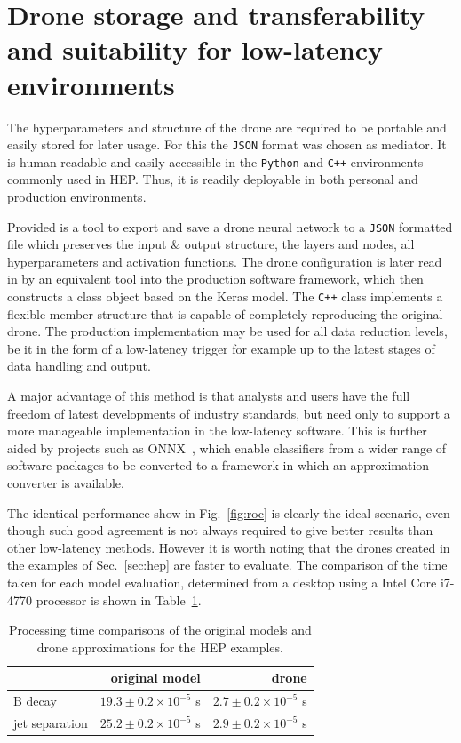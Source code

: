 \documentclass[final,5p,times,twocolumn]{elsarticle}
\begin{document}
\section{Drone storage and transferability and suitability
for low-latency environments}
\label{sec:storage}

The hyperparameters and structure of the drone are required to be
portable and easily stored for later usage. For this the {\tt JSON} format was chosen as
mediator. It is human-readable and easily accessible in the {\tt Python} and {\tt C++}
environments commonly used in HEP. Thus, it is readily deployable in both personal and production environments.

Provided is a tool to export and save a drone neural network to a {\tt JSON}
formatted file which preserves the input \& output structure,
the layers and nodes, all hyperparameters and activation functions.
The drone configuration is later read in by an equivalent tool into the production software framework,
which then constructs a class object based on the Keras model. The {\tt C++} class implements
a flexible member structure that is capable of completely reproducing the original drone. The production
implementation may be used for all data reduction levels, be it in the form of a low-latency trigger
for example up to the latest stages of data handling and output.

A major advantage of this method is that analysts and users have the full freedom of latest developments
of industry standards, but need only to support a more manageable implementation in the low-latency
software. This is further aided by projects such as ONNX~\cite{ONNX}, which enable classifiers from a wider
range of software packages to be converted to a framework in which an approximation converter
is available.

The identical performance show in Fig.~\ref{fig:roc} is clearly the ideal scenario, even though
such good agreement is not always required to give better results than other low-latency methods.
However it is worth noting that the drones created in the examples of Sec.~\ref{sec:hep} are faster to
evaluate. The comparison of the time taken for each model evaluation, determined from a desktop
using a Intel Core i7-4770 processor is shown in Table~\ref{tab:comp}.
\begin{table}[t]
  \centering
  \caption{Processing time comparisons of the original models and drone
  approximations for the HEP examples. \label{tab:comp}}
  \begin{tabular}{l|rr}
                   & original model                  & drone \\
    \hline
    B decay        & $19.3 \pm 0.2 \times 10^{-5}$ s & $2.7 \pm 0.2 \times 10^{-5}$ s \\
    jet separation & $25.2 \pm 0.2 \times 10^{-5}$ s & $2.9 \pm 0.2 \times 10^{-5}$ s \\
  \end{tabular}
\end{table}
\end{document}
